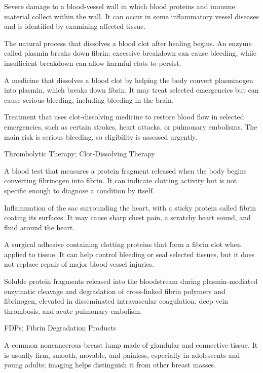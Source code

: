  Severe damage to a blood-vessel wall in which blood proteins and immune material collect within the wall. It can occur in some inflammatory vessel diseases and is identified by examining affected tissue.

 The natural process that dissolves a blood clot after healing begins. An enzyme called plasmin breaks down fibrin; excessive breakdown can cause bleeding, while insufficient breakdown can allow harmful clots to persist.

 A medicine that dissolves a blood clot by helping the body convert plasminogen into plasmin, which breaks down fibrin. It may treat selected emergencies but can cause serious bleeding, including bleeding in the brain.

 Treatment that uses clot-dissolving medicine to restore blood flow in selected emergencies, such as certain strokes, heart attacks, or pulmonary embolisms. The main risk is serious bleeding, so eligibility is assessed urgently.

\synonyms
Thrombolytic Therapy; Clot-Dissolving Therapy

 A blood test that measures a protein fragment released when the body begins converting fibrinogen into fibrin. It can indicate clotting activity but is not specific enough to diagnose a condition by itself.

 Inflammation of the sac surrounding the heart, with a sticky protein called fibrin coating its surfaces. It may cause sharp chest pain, a scratchy heart sound, and fluid around the heart.

 A surgical adhesive containing clotting proteins that form a fibrin clot when applied to tissue. It can help control bleeding or seal selected tissues, but it does not replace repair of major blood-vessel injuries.

 Soluble protein fragments released into the bloodstream during plasmin-mediated enzymatic cleavage and degradation of cross-linked fibrin polymers and fibrinogen, elevated in disseminated intravascular coagulation, deep vein thrombosis, and acute pulmonary embolism.

\synonyms
FDPs; Fibrin Degradation Products

 A common noncancerous breast lump made of glandular and connective tissue. It is usually firm, smooth, movable, and painless, especially in adolescents and young adults; imaging helps distinguish it from other breast masses.

